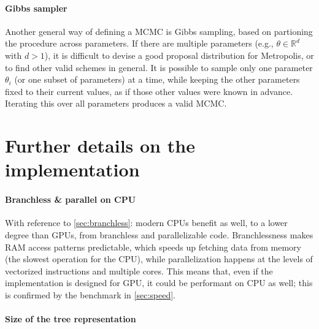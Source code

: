 \documentclass{article}
\begin{document}
    \paragraph{Gibbs sampler}

    Another general way of defining a MCMC is Gibbs sampling, based on partioning the procedure across parameters. If there are multiple parameters (e.g., $\theta \in \mathbb R^d$ with $d > 1$), it is difficult to devise a good proposal distribution for Metropolis, or to find other valid schemes in general. It is possible to sample only one parameter $\theta_i$ (or one subset of parameters) at a time, while keeping the other parameters fixed to their current values, as if those other values were known in advance. Iterating this over all parameters produces a valid MCMC.


    \section{Further details on the implementation}
    \label{sec:impldetails}

    \paragraph{Branchless \& parallel on CPU}

    With reference to \autoref{sec:branchless}: modern CPUs benefit as well, to a lower degree than GPUs, from branchless and parallelizable code. Branchlessness makes RAM access patterns predictable, which speeds up fetching data from memory (the slowest operation for the CPU), while parallelization happens at the levels of vectorized instructions and multiple cores. This means that, even if the implementation is designed for GPU, it could be performant on CPU as well; this is confirmed by the benchmark in \autoref{sec:speed}.

    \paragraph{Size of the tree representation}
\end{document}
